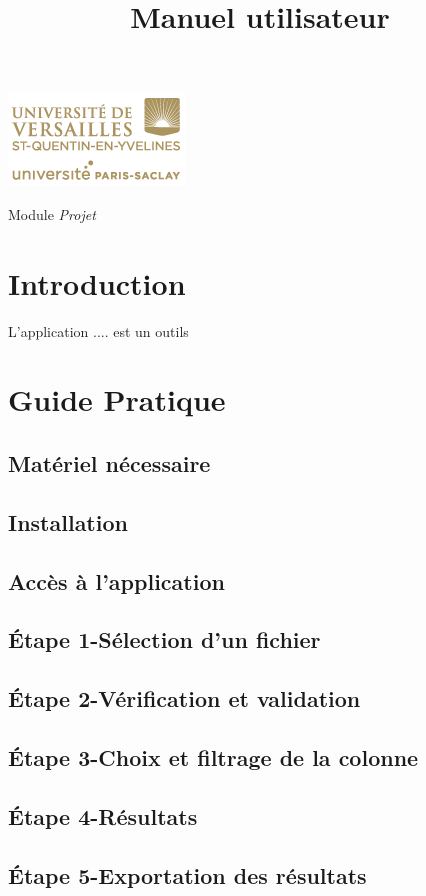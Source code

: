 

\title{\vspace{\fill}\textbf{\Huge Manuel utilisateur}}


\clearpage
\maketitle\vspace{9em}
\begin{center}\includegraphics[scale=0.7]{../Cahier/logo.png}\end{center}
\begin{flushright}Module \textit{Projet}\end{flushright}
\newpage
\tableofcontents
\newpage\clearpage{}

\section{Introduction}
L'application .... est un outils
\section{Guide Pratique}
	\subsection{Matériel nécessaire}
	\subsection{Installation}	
	\subsection{Accès à l'application}
	\subsection{Étape 1-Sélection d'un fichier}
	\subsection{Étape 2-Vérification et validation}
	\subsection{Étape 3-Choix et filtrage de la colonne}
	\subsection{Étape 4-Résultats}
	\subsection{Étape 5-Exportation des résultats}
	

